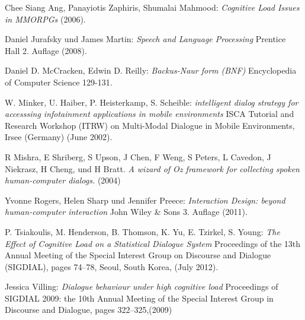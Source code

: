 \documentclass[12pt,a4paper]{scrartcl}
\begin{document}
\newpage
\begin{appendix}


%
%

\begin{thebibliography}{Maron \& Ames, 1982}

	 Chee Siang Ang, Panayiotis Zaphiris, Shumalai Mahmood: \textit{Cognitive Load Issues in MMORPGs} 
(2006).

 Daniel Jurafsky und James Martin: \textit{Speech and Language Processing} Prentice Hall 2. Auflage (2008). 


	 Daniel D. McCracken,
Edwin D. Reilly: \textit{Backus-Naur form (BNF)} Encyclopedia of Computer Science 
129-131.


	 W. Minker, U. Haiber, P. Heisterkamp, S. 
Scheible: \textit{intelligent dialog strategy for accesssing infotainment applications in mobile 
environments} ISCA Tutorial and Research Workshop (ITRW) on Multi-Modal Dialogue in Mobile 
Environments, Irsee (Germany) (June 2002).

 R Mishra, E Shriberg, S Upson, J Chen, F Weng, S Peters,
L Cavedon, J Niekrasz, H Cheng, und H Bratt. \textit{A wizard of Oz framework for collecting spoken human-computer dialogs.} (2004)


 Yvonne Rogers, Helen Sharp und Jennifer Preece: \textit{Interaction Design: beyond human-computer interaction} John Wiley \& Sons 3. Auflage (2011). 

	 P. Tsiakoulis, M. Henderson, B. Thomson, K. Yu, E. Tzirkel, S. Young: \textit{The Effect of Cognitive Load on a Statistical Dialogue System} Proceedings of the 13th Annual Meeting of the Special Interest Group on Discourse and Dialogue (SIGDIAL), pages 74–78,
Seoul, South Korea, (July 2012).

 Jessica Villing: \textit{Dialogue behaviour under high cognitive load} Proceedings of SIGDIAL 2009: the 10th Annual Meeting of the Special Interest Group in Discourse and Dialogue, pages 322–325,(2009)




\end{thebibliography}
\end{appendix}
\end{document}
